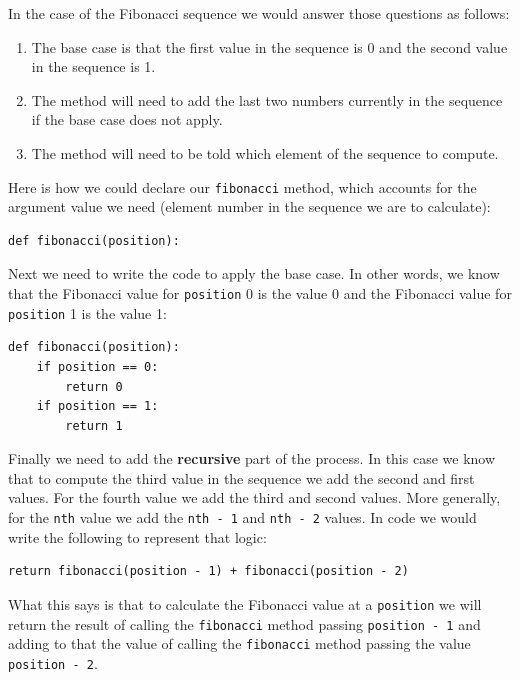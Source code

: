 In the case of the Fibonacci sequence we would answer those questions as follows:

\begin{enumerate}
	\item The base case is that the first value in the sequence is 0 and the second value in the sequence is 1.

	\item The method will need to add the last two numbers currently in the sequence if the base case does not apply.

	\item The method will need to be told which element of the sequence to compute.
\end{enumerate}

Here is how we could declare our \texttt{fibonacci} method, which accounts for the argument value we need (element number in the sequence we are to calculate):

\beforeverb
\begin{verbatim}
def fibonacci(position):
\end{verbatim}
\afterverb

Next we need to write the code to apply the base case. In other words, we know that the Fibonacci value for \texttt{position} 0 is the value 0 and the Fibonacci value for \texttt{position} 1 is the value 1:

\beforeverb
\begin{verbatim}
def fibonacci(position):
    if position == 0:
        return 0
    if position == 1:
        return 1
\end{verbatim}
\afterverb

Finally we need to add the \textbf{recursive} part of the process. In this case we know that to compute the third value in the sequence we add the second and first values. For the fourth value we add the third and second values. More generally, for the \texttt{nth} value we add the \texttt{nth~-~1} and \texttt{nth~-~2} values. In code we would write the following to represent that logic:

\beforeverb
\begin{verbatim}
return fibonacci(position - 1) + fibonacci(position - 2)
\end{verbatim}
\afterverb

What this says is that to calculate the Fibonacci value at a \texttt{position} we will return the result of calling the \texttt{fibonacci} method passing \texttt{position~-~1} and adding to that the value of calling the \texttt{fibonacci} method passing the value \texttt{position~-~2}.

